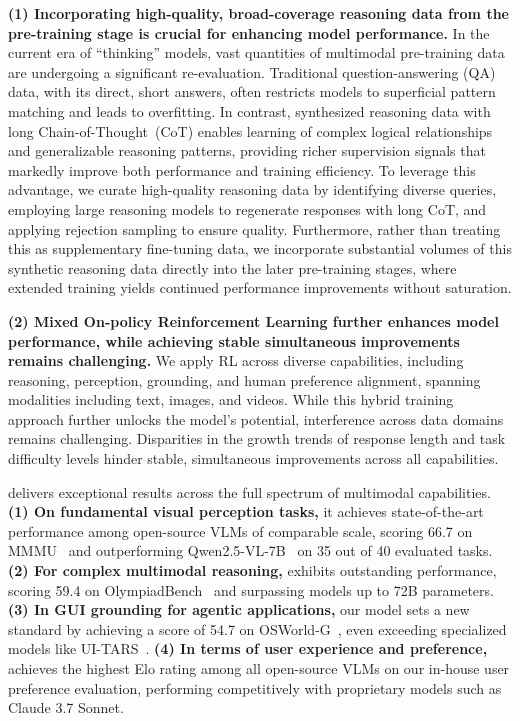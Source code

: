 \textbf{(1) Incorporating high-quality, broad-coverage reasoning data from the pre-training stage is crucial for enhancing model performance. } 
In the current era of ``thinking'' models, vast quantities of multimodal pre-training data are undergoing a significant re-evaluation. Traditional question-answering (QA) data, with its direct, short answers, often restricts models to superficial pattern matching and leads to overfitting. 
In contrast, synthesized reasoning data with long Chain-of-Thought~(CoT) enables learning of complex logical relationships and generalizable reasoning patterns, providing richer supervision signals that markedly improve both performance and training efficiency.
To leverage this advantage, we curate high-quality reasoning data by identifying diverse queries, employing large reasoning models to regenerate responses with long CoT, and applying rejection sampling to ensure quality.
Furthermore, rather than treating this as supplementary fine-tuning data, we incorporate substantial volumes of this synthetic reasoning data directly into the later pre-training stages, where extended training yields continued performance improvements without saturation.


\textbf{(2) Mixed On-policy Reinforcement Learning further enhances model performance, while achieving stable simultaneous improvements remains challenging.}
We apply RL across diverse capabilities, including reasoning, perception, grounding, and human preference alignment, spanning modalities including text, images, and videos.
While this hybrid training approach further unlocks the model's potential, interference across data domains remains challenging.
Disparities in the growth trends of response length and task difficulty levels hinder stable, simultaneous improvements across all capabilities.



\mimovlrl{} delivers exceptional results across the full spectrum of multimodal capabilities.
\textbf{(1) On fundamental visual perception tasks,} it achieves state-of-the-art performance among open-source VLMs of comparable scale, scoring 66.7 on MMMU~\citep{yue2023mmmu} and outperforming Qwen2.5-VL-7B~\citep{Qwen25VL} on 35 out of 40 evaluated tasks. 
\textbf{(2) For complex multimodal reasoning,} \mimovlrl{} exhibits outstanding performance, scoring 59.4 on OlympiadBench~\citep{he2024olympiadbench} and surpassing models up to 72B parameters.
\textbf{(3) In GUI grounding for agentic applications,} our model sets a new standard by achieving a score of 54.7 on OSWorld-G~\citep{osworldg}, even exceeding specialized models like UI-TARS~\citep{qin2025uitars1}.
\textbf{(4) In terms of user experience and preference,} \mimovlrl{} achieves the highest Elo rating among all open-source VLMs on our in-house user preference evaluation, performing competitively with proprietary models such as Claude 3.7 Sonnet.


